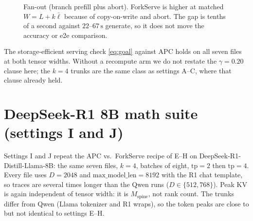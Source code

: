 \documentclass[11pt,a4paper]{article}
\begin{document}
\begin{figure}[h]
\centering
{}
\caption{Fan-out (branch prefill plus abort).
ForkServe is higher at matched $W{=}L+k\bar\ell$ because of copy-on-write and abort.
The gap is tenths of a second against $22$--$67\,\mathrm{s}$ generate, so it does not move the accuracy or e2e comparison.}
\end{figure}

The storage-efficient serving check \eqref{eq:goal} against APC holds on all seven files at both tensor widths.
Without a recompute arm we do not restate the $\gamma{=}0.20$ clause here; the $k{=}4$ trunks are the same class as settings A--C, where that clause already held.

\section{DeepSeek-R1 8B math suite (settings I and J)}

Settings I and J repeat the APC vs.\ ForkServe recipe of E--H on DeepSeek-R1-Distill-Llama-8B:
the same seven files, $k{=}4$, batches of eight, $\mathrm{tp}{=}2$ then $\mathrm{tp}{=}4$.
Every file uses $D{=}2048$ and $\mathrm{max\_model\_len}{=}8192$ with the R1 chat template, so traces are several times longer than the Qwen runs ($D{\in}\{512,768\}$).
Peak KV is again independent of tensor width: it is $M_{\mathrm{spine}}$, not rank count.
The trunks differ from Qwen (Llama tokenizer and R1 wraps), so the token peaks are close to but not identical to settings E--H.
\end{document}
